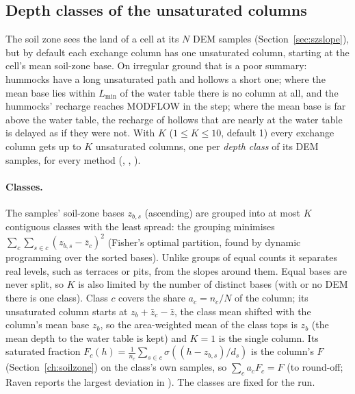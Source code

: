 \subsection{Depth classes of the unsaturated columns}\label{sec:vzclasses}
The soil zone sees the land of a cell at its $N$ DEM samples (Section~\ref{sec:szslope}), but by default each exchange
column has one unsaturated column, starting at the cell's mean soil-zone base. On irregular ground that is a poor
summary: hummocks have a long unsaturated path and hollows a short one; where the mean base lies within $L_{\min}$ of the
water table there is no column at all, and the hummocks' recharge reaches MODFLOW in the step; where the mean base is
far above the water table, the recharge of hollows that are nearly at the water table is delayed as if they were not.
With  $K$ ($1\le K\le10$, default 1) every exchange column gets up to $K$ unsaturated
columns, one per \emph{depth class} of its DEM samples, for every method (, , ).

\paragraph{Classes.} The samples' soil-zone bases $z_{b,s}$ (ascending) are grouped into at most $K$ contiguous classes
with the least spread: the grouping minimises $\sum_c\sum_{s\in c}(z_{b,s}-\bar z_c)^2$ (Fisher's optimal partition,
found by dynamic programming over the sorted bases). Unlike groups of equal counts it separates real levels, such as
terraces or pits, from the slopes around them. Equal bases are never split, so $K$ is also limited by the number of
distinct bases (with  or no DEM there is one class). Class $c$ covers the share $a_c=n_c/N$ of
the column; its unsaturated column starts at $z_b+\bar z_c-\bar z$, the class mean shifted with the column's mean base
$z_b$, so the area-weighted mean of the class tops is $z_b$ (the mean depth to the water table is kept) and $K=1$ is the
single column. Its saturated fraction $F_c(h)=\frac1{n_c}\sum_{s\in c}\sigma((h-z_{b,s})/d_s)$ is the column's $F$ (Section~\ref{ch:soilzone}) on the class's own samples, so
$\sum_c a_c F_c=F$ (to round-off; Raven reports the largest deviation in ). The classes are
fixed for the run.


